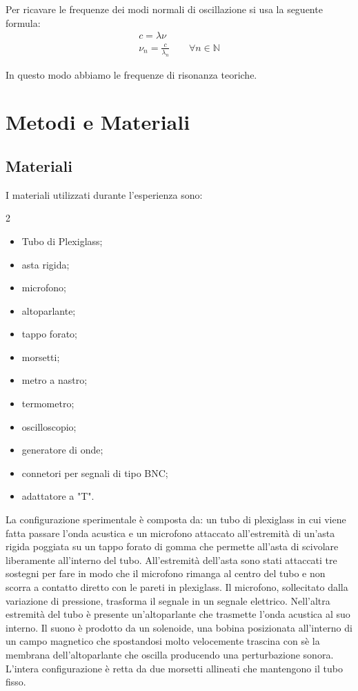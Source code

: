 \documentclass[11pt]{article}
\begin{document}
Per ricavare le frequenze dei modi normali di oscillazione si usa la seguente formula:
\begin{align}
    c=\lambda\nu \label{fondamentale} \qquad\qquad \\ 
    \nu_n=\frac{c}{\lambda_n} \label{frequenza} \qquad \forall n \in \mathbb{N}
\end{align}

In questo modo abbiamo le frequenze di risonanza teoriche.
\newpage
\section{Metodi e Materiali}
\subsection{Materiali}
I materiali utilizzati durante l'esperienza sono:

\begin{multicols}{2}
\begin{itemize}
\item Tubo di Plexiglass;
    \item asta rigida;
    \item microfono;
    \item altoparlante;
    \item tappo forato;
    \item morsetti;
    \item metro a nastro;
    \item termometro;
    \item oscilloscopio;
    \item generatore di onde;
    \item connetori per segnali di tipo BNC;
    \item adattatore a "T".
\end{itemize}
\end{multicols}
La configurazione sperimentale è composta da: un tubo di plexiglass in cui viene fatta passare l'onda acustica e un microfono attaccato all'estremità di un'asta rigida poggiata su un tappo forato di gomma che permette all'asta di scivolare liberamente all'interno del tubo.
All'estremità dell'asta sono stati attaccati tre sostegni per fare in modo che il microfono rimanga al centro del tubo e non scorra a contatto diretto con le pareti in plexiglass.
Il microfono, sollecitato dalla variazione di pressione, trasforma il segnale in un segnale elettrico.
Nell'altra estremità del tubo è presente un'altoparlante che trasmette l'onda acustica al suo interno. Il suono è prodotto da un solenoide, una bobina posizionata all'interno di un campo magnetico che spostandosi molto velocemente trascina con sè la membrana dell'altoparlante che oscilla producendo una perturbazione sonora.
L'intera configurazione è retta da due morsetti allineati che mantengono il tubo fisso.
\end{document}
